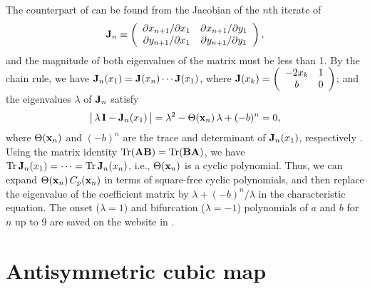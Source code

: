 \documentclass{ws-ijbc}
\begin{document}
The counterpart of 
  can be found from the Jacobian of the $n$th iterate of 
\[
  \mathbf{J}_n
  \equiv
  \left(
    \begin{array}{ccc}
      \partial x_{n+1}/\partial x_1 & \partial x_{n+1}/\partial y_1 \\
      \partial y_{n+1}/\partial x_1 & \partial y_{n+1}/\partial y_1 \\
    \end{array}
  \right),
\]
and the magnitude of both eigenvalues of the matrix must be less than 1.
By the chain rule, we have
  $\mathbf{J}_n (x_1) = \mathbf{J}(x_n) \cdots \mathbf{J}(x_1)$,
  where
$\mathbf{J}(x_k)
  =
  \left(
    \begin{array}{cc}
      -2 x_k & 1 \\
      b & 0
    \end{array}
  \right)$;
and the eigenvalues $\lambda$ of $\mathbf{J}_n$ satisfy
%
\begin{equation}
\big|\, \lambda \, \mathbf{I} - \mathbf{J}_n(x_1) \,\big|
= \lambda^2 - \Theta(\mathbf{x}_{n}) \,\lambda +(-b)^n = 0,
\notag
\end{equation}
%
where $\Theta(\mathbf{x}_{n})$ and $(-b)^n$
  are the trace and determinant of $\mathbf{J}_n(x_1)$,
  respectively \cite{huang, hitzl}.
%
%
Using the matrix identity $\mathrm{Tr}( \mathbf{A} \mathbf{B}) = \mathrm{Tr}(\mathbf{B} \mathbf{A})$,
  we have
    $\mathrm{Tr} \, \mathbf{J}_n(x_1) = \cdots = \mathrm{Tr} \, \mathbf{J}_n(x_n)$,
  i.e., $\Theta(\mathbf{x}_{n})$ is a cyclic polynomial. %
%
  Thus, we can expand $\Theta(\mathbf{x}_{n}) \, C_p(\mathbf{x}_{n})$
  in terms of square-free cyclic polynomials,
  and then replace the eigenvalue of the coefficient matrix
  by $\lambda + (-b)^n/\lambda$
  in the characteristic equation.
%
%
%
The onset ($\lambda = 1$) and bifurcation ($\lambda = -1$)
  polynomials of $a$ and $b$
  for $n$ up to 9 are saved on the website in .











\section{\label{sec:cubic}Antisymmetric cubic map}
\end{document}
